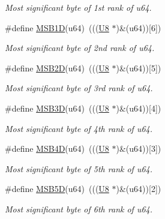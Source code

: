 \begin{DoxyCompactItemize}
\begin{DoxyCompactList}\small\item\em Most significant byte of 1st rank of {\itshape u64}. \end{DoxyCompactList}\item 
\#define \mbox{\hyperlink{group__group__sam0__utils_ga97a0ab6790df95cb4d8021d8850487f8}{M\+S\+B1D}}(u64)~(((\mbox{\hyperlink{group__group__sam0__utils_gaa63ef7b996d5487ce35a5a66601f3e73}{U8}}  $\ast$)\&(u64))\mbox{[}6\mbox{]})
\begin{DoxyCompactList}\small\item\em Most significant byte of 2nd rank of {\itshape u64}. \end{DoxyCompactList}\item 
\#define \mbox{\hyperlink{group__group__sam0__utils_gad4ceacba543e7b8617ca4bd075abb146}{M\+S\+B2D}}(u64)~(((\mbox{\hyperlink{group__group__sam0__utils_gaa63ef7b996d5487ce35a5a66601f3e73}{U8}}  $\ast$)\&(u64))\mbox{[}5\mbox{]})
\begin{DoxyCompactList}\small\item\em Most significant byte of 3rd rank of {\itshape u64}. \end{DoxyCompactList}\item 
\#define \mbox{\hyperlink{group__group__sam0__utils_gaf7972d3282ec9ecb97afa34e848ede2c}{M\+S\+B3D}}(u64)~(((\mbox{\hyperlink{group__group__sam0__utils_gaa63ef7b996d5487ce35a5a66601f3e73}{U8}}  $\ast$)\&(u64))\mbox{[}4\mbox{]})
\begin{DoxyCompactList}\small\item\em Most significant byte of 4th rank of {\itshape u64}. \end{DoxyCompactList}\item 
\#define \mbox{\hyperlink{group__group__sam0__utils_ga1c891624c33b13808633af8dbcaafa5f}{M\+S\+B4D}}(u64)~(((\mbox{\hyperlink{group__group__sam0__utils_gaa63ef7b996d5487ce35a5a66601f3e73}{U8}}  $\ast$)\&(u64))\mbox{[}3\mbox{]})
\begin{DoxyCompactList}\small\item\em Most significant byte of 5th rank of {\itshape u64}. \end{DoxyCompactList}\item 
\#define \mbox{\hyperlink{group__group__sam0__utils_ga5e61db58aaf5cbb3051240cdcb1b5147}{M\+S\+B5D}}(u64)~(((\mbox{\hyperlink{group__group__sam0__utils_gaa63ef7b996d5487ce35a5a66601f3e73}{U8}}  $\ast$)\&(u64))\mbox{[}2\mbox{]})
\begin{DoxyCompactList}\small\item\em Most significant byte of 6th rank of {\itshape u64}. \end{DoxyCompactList}\item 

\end{DoxyCompactItemize}
